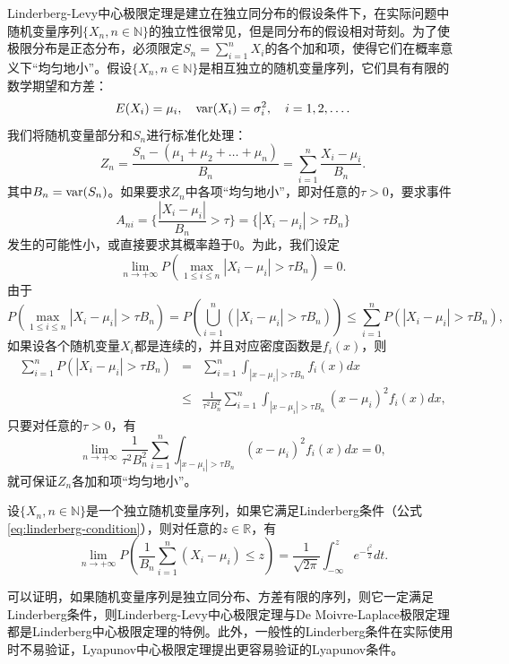 Linderberg-Levy中心极限定理是建立在独立同分布的假设条件下，在实际问题中随机变量序列$\{X_n,n\in \mathbb N\}$的独立性很常见，但是同分布的假设相对苛刻。为了使极限分布是正态分布，必须限定$S_n=\sum\limits_{i=1}^n X_i$的各个加和项，使得它们在概率意义下“均匀地小”。假设$\{X_n,n\in \mathbb N\}$是相互独立的随机变量序列，它们具有有限的数学期望和方差：
\[
    E(X_i) = \mu_i,~~~\operatorname{\mathrm{var}}(X_i)=\sigma_i^2,~~~i=1,2,\ldots.
\]
我们将随机变量部分和$S_n$进行标准化处理：
\[
    Z_n = \frac{S_n - (\mu_1 + \mu_2 + \ldots + \mu_n)}{B_n} = \sum\limits_{i=1}^n \frac{X_i - \mu_i}{B_n}.
\]
其中$B_n=\operatorname{\mathrm{var}}(S_n)$。如果要求$Z_n$中各项“均匀地小”，即对任意的$\tau>0$，要求事件
\[
    A_{ni} = \Big\{\frac{|X_i-\mu_i|}{B_n} > \tau\Big\} = \Big\{|X_i-\mu_i| > \tau B_n\Big\}
\]
发生的可能性小，或直接要求其概率趋于0。为此，我们设定
\[
    \lim\limits_{n\rightarrow +\infty} P(\max\limits_{1\le i \le n} |X_i-\mu_i| > \tau B_n) = 0.
\]
由于
\[
    P(\max\limits_{1\le i \le n} |X_i-\mu_i| > \tau B_n) = P(\bigcup\limits_{i=1}^n (|X_i-\mu_i| > \tau B_n)) \le \sum\limits_{i=1}^n P(|X_i-\mu_i| > \tau B_n),
\]
如果设各个随机变量$X_i$都是连续的，并且对应密度函数是$f_i(x)$，则
\[
\begin{array}{lcl}
    \sum\limits_{i=1}^n P(|X_i-\mu_i| > \tau B_n) &=& \sum\limits_{i=1}^n \int_{|x-\mu_i| > \tau B_n} f_i(x) dx \\
    &\le& \frac{1}{\tau^2 B_n^2} \sum\limits_{i=1}^n \int_{|x-\mu_i| > \tau B_n} (x-\mu_i)^2 f_i(x) dx,
\end{array}
\]
只要对任意的$\tau>0$，有
\begin{equation}\label{eq:linderberg-condition}
    \lim\limits_{n\rightarrow +\infty} \frac{1}{\tau^2 B_n^2} \sum\limits_{i=1}^n \int_{|x-\mu_i| > \tau B_n} (x-\mu_i)^2 f_i(x) dx =0,
\end{equation}
就可保证$Z_n$各加和项“均匀地小”。

\begin{theorem}[Linderberg中心极限定理]
设$\{X_n,n\in \mathbb N\}$是一个独立随机变量序列，如果它满足Linderberg条件（公式\ref{eq:linderberg-condition}），则对任意的$z\in \mathbb R$，有
\[
    \lim\limits_{n\rightarrow +\infty} P(\frac{1}{B_n} \sum\limits_{i=1}^n (X_i-\mu_i) \le z) = \frac{1}{\sqrt{2\pi}}\int_{-\infty}^z e^{-\frac{t^2}{2}}dt.
\]
\end{theorem}
可以证明，如果随机变量序列是独立同分布、方差有限的序列，则它一定满足Linderberg条件，则Linderberg-Levy中心极限定理与De Moivre-Laplace极限定理都是Linderberg中心极限定理的特例。此外，一般性的Linderberg条件在实际使用时不易验证，Lyapunov中心极限定理提出更容易验证的Lyapunov条件。

